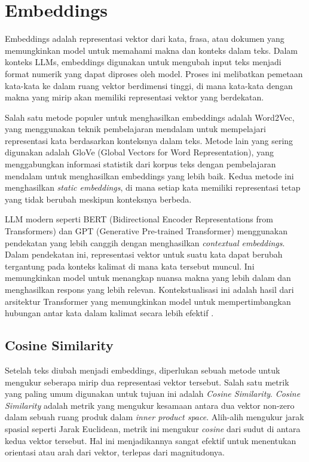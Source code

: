 \section{Embeddings}
\label{sec:embeddings}

Embeddings adalah representasi vektor dari kata, frasa, atau dokumen yang memungkinkan model untuk memahami makna dan konteks dalam teks. Dalam konteks LLMs, embeddings digunakan untuk mengubah input teks menjadi format numerik yang dapat diproses oleh model. Proses ini melibatkan pemetaan kata-kata ke dalam ruang vektor berdimensi tinggi, di mana kata-kata dengan makna yang mirip akan memiliki representasi vektor yang berdekatan.

Salah satu metode populer untuk menghasilkan embeddings adalah Word2Vec, yang menggunakan teknik pembelajaran mendalam untuk mempelajari representasi kata berdasarkan konteksnya dalam teks. Metode lain yang sering digunakan adalah GloVe (Global Vectors for Word Representation), yang menggabungkan informasi statistik dari korpus teks dengan pembelajaran mendalam untuk menghasilkan embeddings yang lebih baik. Kedua metode ini menghasilkan \textit{static embeddings}, di mana setiap kata memiliki representasi tetap yang tidak berubah meskipun konteksnya berbeda.

LLM modern seperti BERT (Bidirectional Encoder Representations from Transformers) dan GPT (Generative Pre-trained Transformer) menggunakan pendekatan yang lebih canggih dengan menghasilkan \textit{contextual embeddings}. Dalam pendekatan ini, representasi vektor untuk suatu kata dapat berubah tergantung pada konteks kalimat di mana kata tersebut muncul. Ini memungkinkan model untuk menangkap nuansa makna yang lebih dalam dan menghasilkan respons yang lebih relevan. Kontekstualisasi ini adalah hasil dari arsitektur Transformer yang memungkinkan model untuk mempertimbangkan hubungan antar kata dalam kalimat secara lebih efektif \parencite{vaswani2023attentionneed}.

\subsection{Cosine Similarity}
\label{sec:cosine_similarity}

Setelah teks diubah menjadi embeddings, diperlukan sebuah metode untuk mengukur seberapa mirip dua representasi vektor tersebut. Salah satu metrik yang paling umum digunakan untuk tujuan ini adalah \textit{Cosine Similarity}. \textit{Cosine Similarity} adalah metrik yang mengukur kesamaan antara dua vektor non-zero dalam sebuah ruang produk dalam \textit{inner product space}. Alih-alih mengukur jarak spasial seperti Jarak Euclidean, metrik ini mengukur \textit{cosine} dari sudut di antara kedua vektor tersebut. Hal ini menjadikannya sangat efektif untuk menentukan orientasi atau arah dari vektor, terlepas dari magnitudonya.

